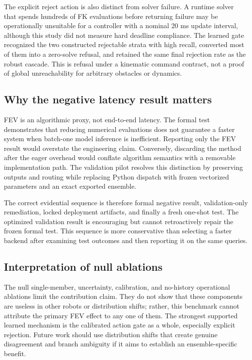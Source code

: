 \documentclass[10pt,a4paper]{article}
\begin{document}
The explicit reject action is also distinct from solver failure. A runtime solver that
spends hundreds of FK evaluations before returning failure may be operationally
unsuitable for a controller with a nominal 20 ms update interval, although this study
did not measure hard deadline compliance. The learned gate recognized the two
constructed rejectable strata with high recall, converted most of them into a
zero-solve refusal, and retained the same final rejection rate as the robust cascade.
This is refusal under a kinematic command contract, not a proof of global
unreachability for arbitrary obstacles or dynamics.

\subsection{Why the negative latency result matters}

FEV is an algorithmic proxy, not end-to-end latency. The formal test demonstrates that
reducing numerical evaluations does not guarantee a faster system when batch-one model
inference is inefficient. Reporting only the FEV result would overstate the engineering
claim. Conversely, discarding the method after the eager overhead would conflate
algorithm semantics with a removable implementation path. The validation pilot
resolves this distinction by preserving outputs and routing while replacing Python
dispatch with frozen vectorized parameters and an exact exported ensemble.

The correct evidential sequence is therefore formal negative result, validation-only
remediation, locked deployment artifacts, and finally a fresh one-shot test. The
optimized validation result is encouraging but cannot retroactively repair the frozen
formal test. This sequence is more conservative than selecting a faster backend after
examining test outcomes and then reporting it on the same queries.

\subsection{Interpretation of null ablations}

The null single-member, uncertainty, calibration, and no-history operational ablations
limit the contribution claim. They do not show that these components are useless in
other robots or distribution shifts; rather, this benchmark cannot attribute the
primary FEV effect to any one of them. The strongest supported learned mechanism is the
calibrated action gate as a whole, especially explicit rejection. Future work should
use distribution shifts that create genuine disagreement and branch ambiguity if it
aims to establish an ensemble-specific benefit.
\end{document}
